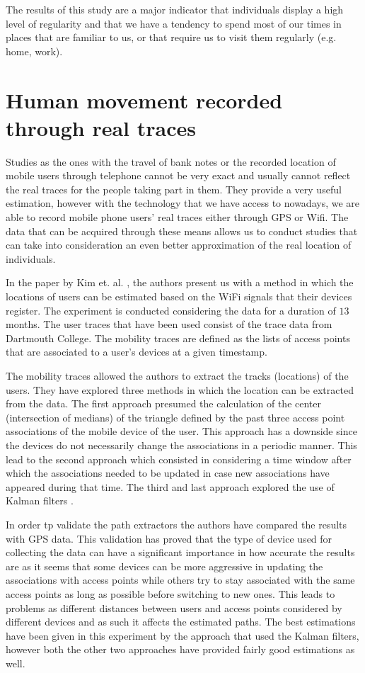 The results of this study are a major indicator that individuals display a high
level of regularity and that we have a tendency to spend most of our times in
places that are familiar to us, or that require us to visit them regularly (e.g.
home, work).

\section{Human movement recorded through real traces}
Studies as the ones with the travel of bank notes or the recorded location of
mobile users through telephone cannot be very exact and usually cannot reflect
the real traces for the people taking part in them. They provide a very useful
estimation, however with the technology that we have access to nowadays, we are
able to record mobile phone users' real traces either through GPS or Wifi. The
data that can be acquired through these means allows us to conduct studies that
can take into consideration an even better approximation of the real location of
individuals.

In the paper by Kim et. al. \cite{Kim06}, the authors present us with a method
in which the locations of users can be estimated based on the WiFi signals that
their devices register. The experiment is conducted considering the data for a
duration of $13$ months. The user traces that have been used consist of the
trace data from Dartmouth College. The mobility traces are defined as the lists
of access points that are associated to a user's devices at a given timestamp.

The mobility traces allowed the authors to extract the tracks (locations) of the
users. They have explored three methods in which the location can be extracted
from the data. The first approach presumed the calculation of the center
(intersection of medians) of the triangle defined by the past three access
point associations of the mobile device of the user. This approach has a
downside since the devices do not necessarily change the associations in a
periodic manner. This lead to the second approach which consisted in considering
a time window after which the associations needed to be updated in case new
associations have appeared during that time. The third and last approach
explored the use of Kalman filters \cite{KalmanFilter}.

In order tp validate the path extractors the authors have compared the results
with GPS data. This validation has proved that the type of device used for
collecting the data can have a significant importance in how accurate the
results are as it seems that some devices can be more aggressive in updating the
associations with access points while others try to stay associated with the
same access points as long as possible before switching to new ones. This leads
to problems as different distances between users and access points considered by
different devices and as such it affects the estimated paths. The best
estimations have been given in this experiment by the approach that used the
Kalman filters, however both the other two approaches have provided fairly good
estimations as well.

